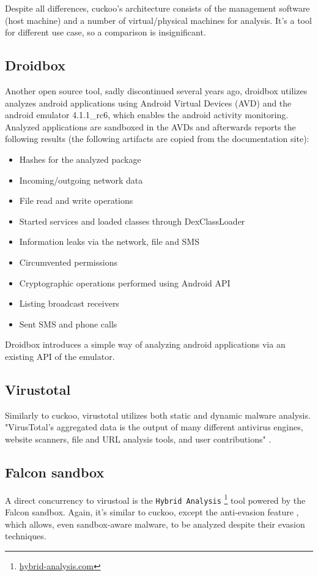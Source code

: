Despite all differences, cuckoo's architecture consists of the management software (host machine) and a number of virtual/physical machines for analysis. It's a tool for different use case, so a comparison is insignificant.

\subsection{Droidbox \label{related:malware-anal:droidbox}}
Another open source tool, sadly discontinued several years ago, droidbox utilizes analyzes android applications using Android Virtual Devices (AVD) and the android emulator 4.1.1\_rc6, which enables the android activity monitoring. Analyzed applications are sandboxed in the AVDs and afterwards reports the following results (the following artifacts are copied from the documentation site):

\begin{itemize}[noitemsep]
	\item
	Hashes for the analyzed package
	\item
	Incoming/outgoing network data
	\item
	File read and write operations
	\item
	Started services and loaded classes through DexClassLoader
	\item
	Information leaks via the network, file and SMS
	\item
	Circumvented permissions
	\item
	Cryptographic operations performed using Android API
	\item
	Listing broadcast receivers
	\item
	Sent SMS and phone calls
\end{itemize}

Droidbox introduces a simple way of analyzing android applications via an existing API of the emulator.

\subsection{Virustotal \label{related:malware-anal:virustotal}}
Similarly to cuckoo, virustotal utilizes both static and dynamic malware analysis. "VirusTotal's aggregated data is the output of many different antivirus engines, website scanners, file and URL analysis tools, and user contributions" \cite{docs:virustotal}.

\subsection{Falcon sandbox \label{related:malware-anal:falcon}}
A direct concurrency to virustoal is the \texttt{Hybrid Analysis} \footnote{\url{hybrid-analysis.com}} tool powered by the Falcon sandbox. Again, it's similar to cuckoo, except the anti-evasion feature \cite{blog:detonation-techs}, which allows, even sandbox-aware malware, to be analyzed despite their evasion techniques.

